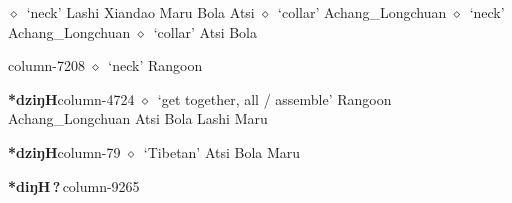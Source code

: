          $\diamond$~`neck'
         Lashi 
\hspace{1ex}
         Xiandao 
\hspace{1ex}
         Maru 
\hspace{1ex}
         Bola 
\hspace{1ex}
         Atsi 
\hspace{1ex}
         $\diamond$~`collar'
         Achang\_Longchuan 
\hspace{1ex}
         $\diamond$~`neck'
         Achang\_Longchuan 
\hspace{1ex}
         $\diamond$~`collar'
         Atsi 
\hspace{1ex}
         Bola 
  \item {\footnotesize \textbf{}}{\tiny column-7208}
         $\diamond$~`neck'
         Rangoon 
  \item {\footnotesize \textbf{*dziŋH}}{\tiny column-4724}
         $\diamond$~`get together, all / assemble'
         Rangoon 
\hspace{1ex}
         Achang\_Longchuan 
\hspace{1ex}
         Atsi 
\hspace{1ex}
         Bola 
\hspace{1ex}
         Lashi 
\hspace{1ex}
         Maru 
  \item {\footnotesize \textbf{*dziŋH}}{\tiny column-79}
         $\diamond$~`Tibetan'
         Atsi 
\hspace{1ex}
         Bola 
\hspace{1ex}
         Maru 
  \item {\footnotesize \textbf{*diŋH\,?\,}}{\tiny column-9265}
